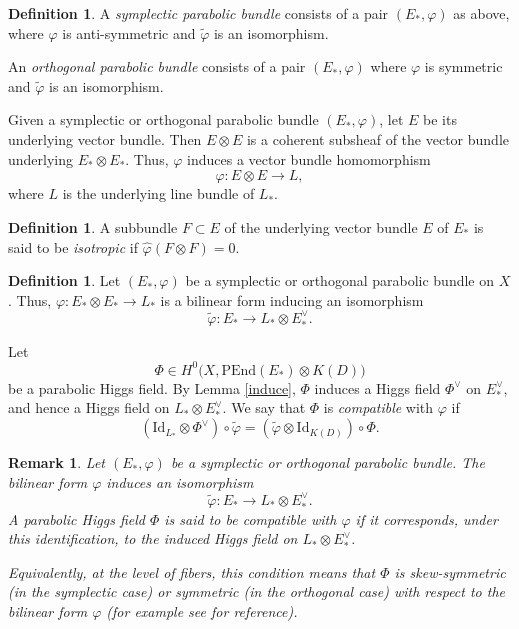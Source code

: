 \documentclass[11pt, reqno]{amsart}
\numberwithin{equation}{section}
\newtheorem{remark}[theorem]{Remark}
\theoremstyle{definition}
\newtheorem{definition}[theorem]{Definition}
\begin{document}
\begin{definition}\label{maindefn}
A \textit{symplectic parabolic bundle} consists of a pair $(E_*,\varphi)$ as above, where $\varphi$ is anti-symmetric and $\tilde{\varphi}$ is an isomorphism. 
	
An \textit{orthogonal parabolic bundle} consists of a pair $(E_*,\varphi)$ where $\varphi$ is symmetric and $\tilde{\varphi}$ is an isomorphism.
\end{definition}
 Given a symplectic or orthogonal parabolic bundle $(E_*,\varphi)$, let $E$ be its underlying vector bundle. Then $E \otimes E$ is a coherent subsheaf of the vector bundle underlying $E_*\otimes E_*$. Thus, $\varphi$ induces a vector bundle homomorphism
\begin{equation}\label{underlying}
\hat{\varphi} : E \otimes E \to L,
\end{equation}
where $L$ is the underlying line bundle of $L_*$. 

\begin{definition}
A subbundle $F \subset E$ of the underlying vector bundle $E$ of $E_*$ is said to be \textit{isotropic} if $\hat{\varphi}(F \otimes F)=0$.
\end{definition}


\begin{definition}\label{compatible}
Let $(E_*,\varphi)$ be a symplectic or orthogonal parabolic bundle on $X$. Thus, $\varphi : E_* \otimes E_* \to L_*$ is a bilinear form inducing an isomorphism
\[
\tilde{\varphi} : E_* \longrightarrow L_* \otimes E_*^\vee.
\]

Let 
\[
\Phi \in H^0\bigl(X,\mathrm{PEnd}(E_*)\otimes K(D)\bigr)
\]
be a parabolic Higgs field. By Lemma \ref{induce}, $\Phi$ induces a Higgs field $\Phi^\vee$ on $E_*^\vee$, and hence a Higgs field on $L_* \otimes E_*^\vee$. We say that $\Phi$ is \textit{compatible} with $\varphi$ if
\[
(\mathrm{Id}_{L_*}\otimes \Phi^\vee)\circ \tilde{\varphi}
=
(\tilde{\varphi}\otimes \mathrm{Id}_{K(D)})\circ \Phi.
\]
\end{definition}

\medskip

\begin{remark}
Let $(E_*,\varphi)$ be a symplectic or orthogonal parabolic bundle. The bilinear form $\varphi$ induces an isomorphism
\[
\widetilde{\varphi} : E_* \longrightarrow L_* \otimes E_*^\vee.
\]
A parabolic Higgs field $\Phi$ is said to be compatible with $\varphi$ if it corresponds, under this identification, to the induced Higgs field on $L_* \otimes E_*^\vee$.

Equivalently, at the level of fibers, this condition means that $\Phi$ is skew-symmetric (in the symplectic case) or symmetric (in the orthogonal case) with respect to the bilinear form $\varphi$ (for example see \cite{GGR09} for reference).
\end{remark}
\end{document}
